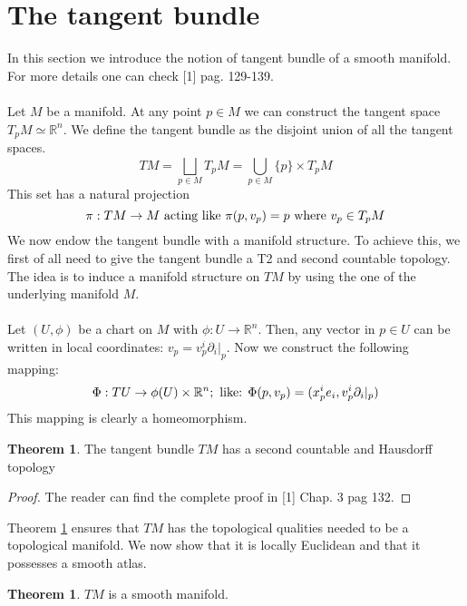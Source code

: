 \documentclass[12pt,a4paper]{report}
\theoremstyle{definition}
\theoremstyle{Theorem}
\newtheorem{Theo}[Def]{Theorem}
\theoremstyle{definition}
\theoremstyle{definition}
\begin{document}
	\section{The tangent bundle}
	In this section we introduce the notion of tangent bundle of a smooth manifold. For more details one can check [1] pag. 129-139.\\
	\\
	Let $M$ be a manifold. At any point $p\in M$ we can construct the tangent space $T_pM\simeq \mathbb{R}^n$. We define the tangent bundle as the disjoint union of all the tangent spaces.
	$$TM=\bigsqcup_{p\in M}T_pM=\bigcup_{p\in M} \{p\}\times T_pM$$
	This set has a natural projection 
	$$\pi:TM\rightarrow M\hbox{ acting like }\pi(p,v_p)=p \hbox{ where }v_p\in T_pM$$  
	We now endow the tangent bundle with a manifold structure. To achieve this, we first of all need to give the tangent bundle a T2 and second countable topology. The idea is to induce a manifold structure on $TM$ by using the one of the underlying manifold $M$.\\
	\\
	Let $(U,\phi)$ be a chart on $M$ with $\phi:U\rightarrow \mathbb{R}^n$. Then, any vector in $p\in U$ can be written in local coordinates: $v_p=v^i_p\partial_i|_p$. Now we construct the following mapping:
	$$\Phi:TU\rightarrow \phi(U)\times \mathbb{R}^n; \hbox{ like: }
	\Phi(p,v_p)=(x^i_pe_i,v^i_p\partial_i|_p)$$
	This mapping is clearly a homeomorphism.
	\begin{Theo} \label{Theo_1.1}
		The tangent bundle $TM$ has a second countable and Hausdorff topology
	\end{Theo}
	\begin{proof}
		The reader can find the complete proof in [1] Chap. 3 pag 132.
	\end{proof}
	Theorem \ref{Theo_1.1} ensures that $TM$ has the topological qualities needed to be a topological manifold. We now show that it is locally Euclidean and that it possesses a smooth atlas.
	\begin{Theo}
		$TM$ is a smooth manifold.
	\end{Theo}
\end{document}
